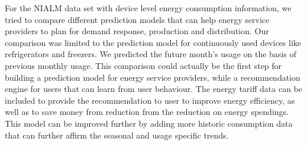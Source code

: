 For the NIALM data set with device level energy consumption information, we tried to compare different prediction models that can help energy service providers to plan for demand response, production and distribution. Our comparison was limited to the prediction model for continuously used devices like refrigerators and freezers. We predicted the future month's usage on the basis of previous monthly usage. This comparison could actually be the first step for building a prediction model for energy service providers, while a recommendation engine for users that can learn from user behaviour. The energy tariff data can be included to provide the recommendation to user to improve energy efficiency, as well as to save money from reduction from the reduction on energy spendings. This model can be improved further by adding more historic consumption data that can further affirm the seasonal and usage specific trends.    